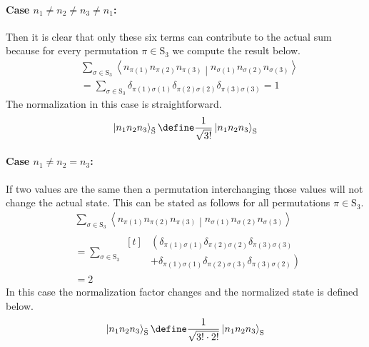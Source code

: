 \documentclass[10pt,fleqn]{article}
\newcommand{\ket}[1]{\left\vert #1 \right\rangle}
\newcommand{\bracket}[2]{\left\langle #1 \middle\vert #2 \right\rangle}
\begin{document}
\begin{multicols}{2}
      \paragraph{Case $n_1\neq n_2\neq n_3 \neq n_1$:}
      Then it is clear that only these six terms can contribute to the actual sum because for every permutation $π\in\mathrm{S}_3$ we compute the result below.
      \begin{align*}
        &\sum_{σ\in\mathrm{S}_3}\bracket{n_{π(1)}n_{π(2)}n_{π(3)}}{n_{σ(1)}n_{σ(2)}n_{σ(3)}} \\
        &= \sum_{σ\in\mathrm{S}_3} δ_{{π(1)}{σ(1)}} δ_{{π(2)}{σ(2)}} δ_{{π(3)}{σ(3)}}
        = 1
      \end{align*}
      The normalization in this case is straightforward.
      \[
        \ket{n_1n_2n_3}_{\tilde{\mathrm{S}}} \define \frac{1}{\sqrt{3!}}\ket{n_1n_2n_3}_\mathrm{S}
      \]

      \paragraph{Case $n_1\neq n_2 = n_3$:}
      If two values are the same then a permutation interchanging those values will not change the actual state.
      This can be stated as follows for all permutations $π\in\mathrm{S}_3$.
      \begin{align*}
        &\sum_{σ\in\mathrm{S}_3}\bracket{n_{π(1)}n_{π(2)}n_{π(3)}}{n_{σ(1)}n_{σ(2)}n_{σ(3)}} \\
        &= \sum_{σ\in\mathrm{S}_3}
          \begin{aligned}[t]
            & \left( δ_{{π(1)}{σ(1)}} δ_{{π(2)}{σ(2)}} δ_{{π(3)}{σ(3)}} \right. \\
            & \left. + δ_{{π(1)}{σ(1)}} δ_{{π(2)}{σ(3)}} δ_{{π(3)}{σ(2)}} \right)
          \end{aligned}
        \\
        &= 2
      \end{align*}
      In this case the normalization factor changes and the normalized state is defined below.
      \[
        \ket{n_1n_2n_3}_{\tilde{\mathrm{S}}} \define \frac{1}{\sqrt{3!\cdot 2!}}\ket{n_1n_2n_3}_\mathrm{S}
      \]


\end{multicols}
\end{document}
